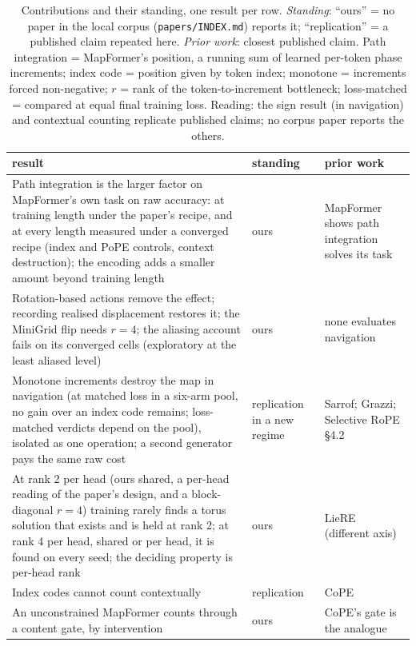\documentclass[10pt]{article}
\begin{document}
\begin{table}[t]
\centering
\small
\captionsetup{font=footnotesize,skip=4pt}
\caption{Contributions and their standing, one result per row. \emph{Standing}: ``ours'' = no paper in the local corpus (\texttt{papers/INDEX.md}) reports it; ``replication'' = a published claim repeated here. \emph{Prior work}: closest published claim. Path integration = MapFormer's position, a running sum of learned per-token phase increments; index code = position given by token index; monotone = increments forced non-negative; $r$ = rank of the token-to-increment bottleneck; loss-matched = compared at equal final training loss. Reading: the sign result (in navigation) and contextual counting replicate published claims; no corpus paper reports the others.}
\label{tab:contrib}
\begin{tabular}{@{}p{8.3cm}p{2.2cm}p{3.9cm}@{}}
\toprule
result & standing & prior work \\
\midrule
Path integration is the larger factor on MapFormer's own task on raw accuracy: at training length under the paper's recipe, and at every length measured under a converged recipe (index and PoPE controls, context destruction); the encoding adds a smaller amount beyond training length & ours & MapFormer shows path integration solves its task \\
Rotation-based actions remove the effect; recording realised displacement restores it; the MiniGrid flip needs $r=4$; the aliasing account fails on its converged cells (exploratory at the least aliased level) & ours & none evaluates navigation \\
Monotone increments destroy the map in navigation (at matched loss in a six-arm pool, no gain over an index code remains; loss-matched verdicts depend on the pool), isolated as one operation; a second generator pays the same raw cost & replication in a new regime & Sarrof; Grazzi; Selective RoPE \S4.2 \\
At rank 2 per head (ours shared, a per-head reading of the paper's design, and a block-diagonal $r=4$) training rarely finds a torus solution that exists and is held at rank 2; at rank 4 per head, shared or per head, it is found on every seed; the deciding property is per-head rank & ours & LieRE (different axis) \\
Index codes cannot count contextually & replication & CoPE \\
An unconstrained MapFormer counts through a content gate, by intervention & ours & CoPE's gate is the analogue \\

\end{tabular}
\end{table}
\end{document}
